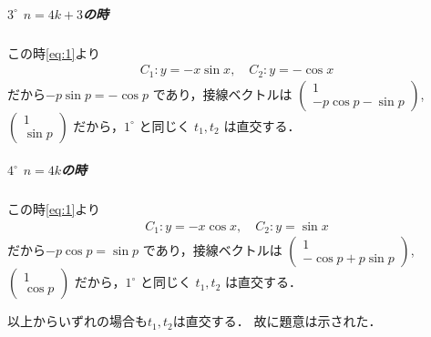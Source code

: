 \documentclass[../../main.tex]{subfiles}
\begin{document}
\subparagraph{$3^\circ$ $n=4k+3$の時}

この時\cref{eq:1}より
\begin{align}
  C_1 : y = -x\sin x, \quad
  C_2 : y = -\cos x
\end{align}
だから$-p \sin p = -\cos p$ であり，接線ベクトルは
$
\begin{pmatrix} 1 \\ -p \cos p - \sin p
\end{pmatrix}$, $
\begin{pmatrix} 1 \\ \sin p
\end{pmatrix}$
だから，$1^\circ$ と同じく $t_1, t_2$ は直交する．

\subparagraph{$4^\circ$ $n=4k$の時}

この時\cref{eq:1}より
\begin{align}
  C_1 : y = -x\cos x,\quad
  C_2 : y = \sin x
\end{align}
だから$-p \cos p = \sin p$ であり，接線ベクトルは
$
\begin{pmatrix} 1 \\ -\cos p + p \sin p
\end{pmatrix}$, $
\begin{pmatrix} 1 \\ \cos p
\end{pmatrix}$
だから，$1^\circ$ と同じく $t_1, t_2$ は直交する．
\casesend

以上からいずれの場合も$t_1,t_2$は直交する．
故に題意は示された．

\newpage
\end{document}
